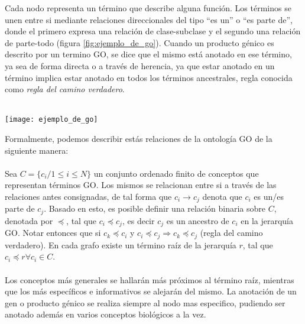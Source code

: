 Cada nodo representa un término que describe alguna función. Los términos se unen entre si mediante relaciones direccionales del tipo ``es un'' o ``es parte de'', donde el primero expresa una relación de clase-subclase y el segundo una relación de parte-todo (figura \ref{fig:ejemplo_de_go}). Cuando un producto génico es descrito por un termino GO, se dice que el mismo está anotado en ese término, ya sea de forma directa o a través de herencia, ya que estar anotado en un término implica estar anotado en todos los términos ancestrales, regla conocida como \textit{regla del camino verdadero}.\\\\
\begin{center}
    \texttt{[image: ejemplo\_de\_go]}
    \label{fig:ejemplo_de_go}
\end{center}
Formalmente, podemos describir estás relaciones de la ontología GO de la siguiente manera:\\\\
Sea $C=\{c_i / 1\leq i \leq N\}$ un conjunto ordenado finito de conceptos que representan términos GO. Los mismos se relacionan entre si a través de las relaciones antes consignadas, de tal forma que $c_i \rightarrow c_j$ denota que $c_i$ es un/es parte de $c_j$. Basado en esto, es posible definir una relación binaria sobre $C$, denotada por $\preceq$, tal que $c_i \preceq c_j$, es decir $c_j$ es un ancestro de $c_i$ en la jerarquía GO. Notar entonces que si $c_k \preceq c_i$ y $c_i \preceq c_j \Rightarrow c_k \preceq c_j$ (regla del camino verdadero). En cada grafo existe un término raíz de la jerarquía $r$, tal que $c_i \preceq r \forall c_i \in C$.\\\\
Los conceptos más generales se hallarán más próximos al término raíz, mientras que los más específicos e informativos se alejarán del mismo. La anotación de un gen o producto génico se realiza siempre al nodo mas especifico, pudiendo ser anotado además en varios conceptos biológicos a la vez.\\\\
